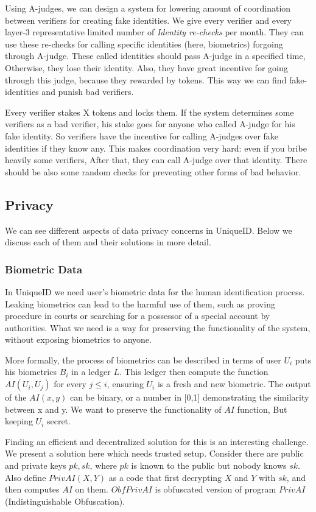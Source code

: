 \documentclass[conference]{IEEEtran}
\begin{document}
Using A-judges, we can design a system for lowering amount of coordination between verifiers for creating fake identities. We give every verifier and every layer-3 representative limited number of \textit{Identity re-checks} per month. They can use these re-checks for calling specific identities (here, biometrics) forgoing through A-judge. These called identities should pass A-judge in a specified time, Otherwise, they lose their identity. Also, they have great incentive for going through this judge, because they rewarded by tokens. This way we can find fake-identities and punish bad verifiers.


Every verifier stakes X tokens and locks them. If the system determines some verifiers as a bad verifier, his stake goes for anyone who called A-judge for his fake identity. So verifiers have the incentive for calling A-judges over fake identities if they know any. This makes coordination very hard: even if you bribe heavily some verifiers, After that, they can call A-judge over that identity. There should be also some random checks for preventing other forms of bad behavior.

\subsection{Privacy}
We can see different aspects of data privacy concerns in UniqueID. Below we discuss each of them and their solutions in more detail.


\subsubsection*{Biometric Data}
In UniqueID we need user's biometric data for the human identification process. Leaking biometrics can lead to the harmful use of them, such as proving procedure in courts or searching for a possessor of a special account by authorities. What we need is a way for preserving the functionality of the system, without exposing biometrics to anyone.


More formally, the process of biometrics can be described in terms of user $U_i$ puts his biometrics $B_i$ in a ledger $L$. This ledger then compute the function $AI(U_i,U_j)$ for every $j \leq i$, ensuring $U_i$ is a fresh and new biometric. The output of the $AI(x,y)$ can be binary, or a number in [0,1] demonstrating the similarity between x and y. We want to preserve the functionality of $AI$ function, But keeping $U_i$ secret. 

Finding an efficient and decentralized solution for this is an interesting challenge. We present a solution here which needs trusted setup. Consider there are public and private keys $pk,sk$, where $pk$ is known to the public but nobody knows $sk$. Also define $PrivAI(X, Y)$ as a code that first decrypting $X$ and $Y$ with $sk$, and then computes $AI$ on them. $ObfPrivAI$ is obfuscated version of program $PrivAI$ (Indistinguishable Obfuscation). 
\end{document}
